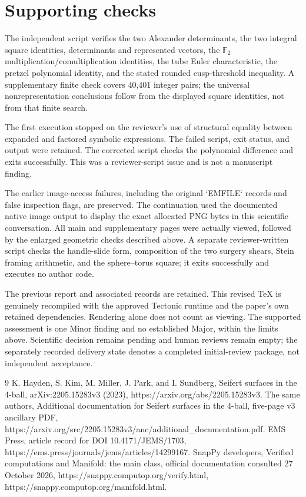 \documentclass[10pt]{article}
\begin{document}
\section*{Supporting checks}
The independent script verifies the two Alexander determinants, the two integral square identities, determinants and represented vectors, the \(\mathbb F_2\) multiplication/comultiplication identities, the tube Euler characteristic, the pretzel polynomial identity, and the stated rounded cusp-threshold inequality. A supplementary finite check covers 40,401 integer pairs; the universal nonrepresentation conclusions follow from the displayed square identities, not from that finite search.\par
The first execution stopped on the reviewer’s use of structural equality between expanded and factored symbolic expressions. The failed script, exit status, and output were retained. The corrected script checks the polynomial difference and exits successfully. This was a reviewer-script issue and is not a manuscript finding.\par
The earlier image-access failures, including the original `EMFILE` records and false inspection flags, are preserved. The continuation used the documented native image output to display the exact allocated PNG bytes in this scientific conversation. All main and supplementary pages were actually viewed, followed by the enlarged geometric checks described above. A separate reviewer-written script checks the handle-slide form, composition of the two surgery shears, Stein framing arithmetic, and the sphere–torus square; it exits successfully and executes no author code.\par
The previous report and associated records are retained. This revised TeX is genuinely recompiled with the approved Tectonic runtime and the paper’s own retained dependencies. Rendering alone does not count as viewing. The supported assessment is one Minor finding and no established Major, within the limits above. Scientific decision remains pending and human reviews remain empty; the separately recorded delivery state denotes a completed initial-review package, not independent acceptance.\par
9 K. Hayden, S. Kim, M. Miller, J. Park, and I. Sundberg, Seifert surfaces in the 4-ball, arXiv:2205.15283v3 (2023), https://arxiv.org/abs/2205.15283v3. The same authors, Additional documentation for Seifert surfaces in the 4-ball, five-page v3 ancillary PDF, https://arxiv.org/src/2205.15283v3/anc/additional\_documentation.pdf. EMS Press, article record for DOI 10.4171/JEMS/1703, https://ems.press/journals/jems/articles/14299167. SnapPy developers, Verified computations and Manifold: the main class, official documentation consulted 27 October 2026, https://snappy.computop.org/verify.html, https://snappy.computop.org/manifold.html.\par
\end{document}
